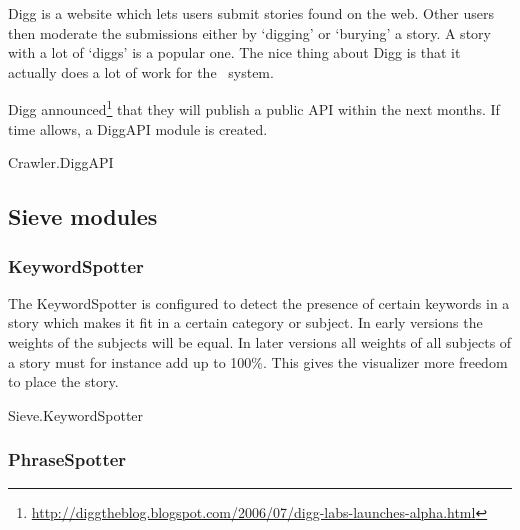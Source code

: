 Digg is a website which lets users submit stories found on the web. Other users
then moderate the submissions either by `digging' or `burying' a story. A story
with a lot of `diggs' is a popular one. The nice thing about Digg is that it
actually does a lot of work for the \Amber\ system.

Digg
announced\footnote{\url{http://diggtheblog.blogspot.com/2006/07/digg-labs-launches-alpha.html}}
that they will publish a public API within the next months. If time allows, a
DiggAPI module is created.

\begin{module}{Crawler.DiggAPI}
\end{module}

% 
% 


\subsection{Sieve modules}

\subsubsection{KeywordSpotter}

The KeywordSpotter is configured to detect the presence of certain keywords in
a story which makes it fit in a certain category or subject. In early versions
the weights of the subjects will be equal. In later versions all weights of all
subjects of a story must for instance add up to 100\%. This gives the
visualizer more freedom to place the story.

\begin{module}{Sieve.KeywordSpotter}
\end{module}

\subsubsection{PhraseSpotter}

